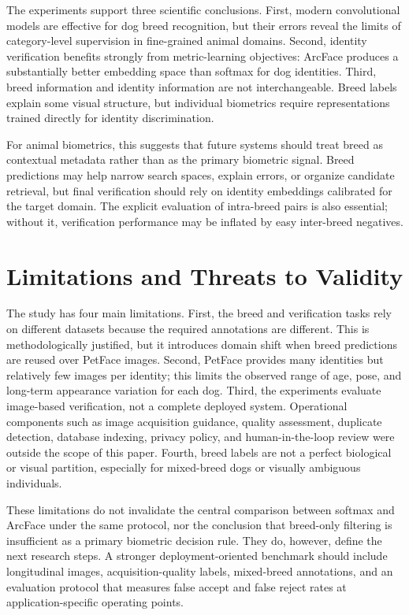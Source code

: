 \documentclass[conference]{IEEEtran}
\begin{document}
The experiments support three scientific conclusions. First, modern convolutional models are effective for dog breed recognition, but their errors reveal the limits of category-level supervision in fine-grained animal domains. Second, identity verification benefits strongly from metric-learning objectives: ArcFace produces a substantially better embedding space than softmax for dog identities. Third, breed information and identity information are not interchangeable. Breed labels explain some visual structure, but individual biometrics require representations trained directly for identity discrimination.

For animal biometrics, this suggests that future systems should treat breed as contextual metadata rather than as the primary biometric signal. Breed predictions may help narrow search spaces, explain errors, or organize candidate retrieval, but final verification should rely on identity embeddings calibrated for the target domain. The explicit evaluation of intra-breed pairs is also essential; without it, verification performance may be inflated by easy inter-breed negatives.

\section{Limitations and Threats to Validity}

The study has four main limitations. First, the breed and verification tasks rely on different datasets because the required annotations are different. This is methodologically justified, but it introduces domain shift when breed predictions are reused over PetFace images. Second, PetFace provides many identities but relatively few images per identity; this limits the observed range of age, pose, and long-term appearance variation for each dog. Third, the experiments evaluate image-based verification, not a complete deployed system. Operational components such as image acquisition guidance, quality assessment, duplicate detection, database indexing, privacy policy, and human-in-the-loop review were outside the scope of this paper. Fourth, breed labels are not a perfect biological or visual partition, especially for mixed-breed dogs or visually ambiguous individuals.

These limitations do not invalidate the central comparison between softmax and ArcFace under the same protocol, nor the conclusion that breed-only filtering is insufficient as a primary biometric decision rule. They do, however, define the next research steps. A stronger deployment-oriented benchmark should include longitudinal images, acquisition-quality labels, mixed-breed annotations, and an evaluation protocol that measures false accept and false reject rates at application-specific operating points.
\end{document}
